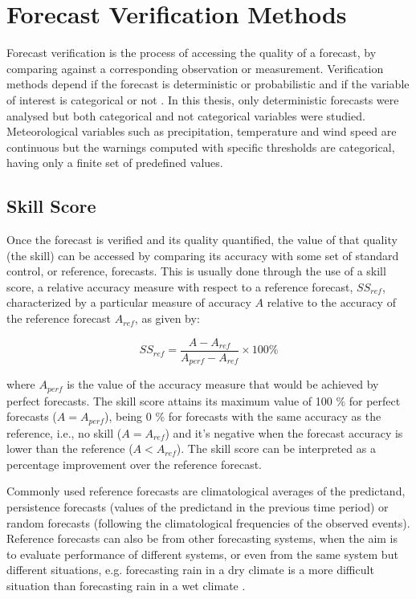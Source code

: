 \FloatBarrier
\chapter{Forecast Verification Methods}
\label{sec:verif}

Forecast verification is the process of accessing the quality of a forecast, by comparing against a corresponding observation or measurement. Verification methods depend if the forecast is deterministic or probabilistic and if the variable of interest is categorical or not \citep{VerifFAQ}. In this thesis, only deterministic forecasts were analysed but both categorical and not categorical variables were studied. Meteorological variables such as precipitation, temperature and wind speed are continuous but the warnings computed with specific thresholds are categorical, having only a finite set of predefined values. 

\section{Skill Score}
\label{sec:verif_ss}

Once the forecast is verified and its quality quantified, the value of that quality (the skill) can be accessed by comparing its accuracy with some set of standard control, or reference, forecasts. This is usually done through the use of a skill score, a relative accuracy measure with respect to a reference forecast, $SS_{ref}$, characterized by a particular measure of accuracy $A$ relative to the accuracy of the reference forecast $A_{ref}$, as given by:

\begin{equation}
    SS_{ref} = \frac{A-A_{ref}}{A_{perf} - A_{ref}} \times 100\%
    \label{eq:ss}
\end{equation}

where $A_{perf}$ is the value of the accuracy measure that would be achieved by perfect forecasts. The skill score attains its maximum value of 100 \% for perfect forecasts ($A=A_{perf}$), being 0 \% for forecasts with the same accuracy as the reference, i.e., no skill ($A=A_{ref}$) and it's negative when the forecast accuracy is lower than the reference ($A<A_{ref}$). The skill score can be interpreted as a percentage improvement over the reference forecast. 

Commonly used reference forecasts are climatological averages of the predictand, persistence forecasts (values of the predictand in the previous time period) or random forecasts (following the climatological frequencies of the observed events). Reference forecasts can also be from other forecasting systems, when the aim is to evaluate performance of different systems, or even from the same system but different situations, e.g. forecasting rain in a dry climate is a more difficult situation than forecasting rain in a wet climate \citep{Wilks2005}.

